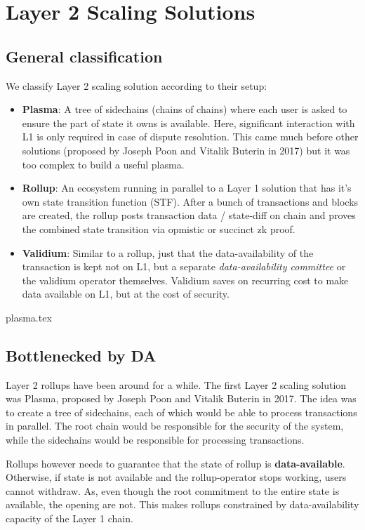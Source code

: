 
\chapter{Layer 2 Scaling Solutions}

\section{General classification}
We classify Layer 2 scaling solution according to their setup:
\begin{itemize}
    \item \textbf{Plasma}: A tree of sidechains (chains of chains) where each user is asked to ensure the part of state it owns is available. Here, significant interaction with L1 is only required in case of dispute resolution. This came much before other solutions (proposed by Joseph Poon and Vitalik Buterin in 2017) but it was too complex to build a useful plasma.
    \item \textbf{Rollup}: An ecosystem running in parallel to a Layer 1 solution that has it's own state transition function (STF). After a bunch of transactions and blocks are created, the rollup posts transaction data / state-diff on chain and proves the combined state transition via opmistic or succinct zk proof.
    \item \textbf{Validium}: Similar to a rollup, just that the data-availability of the transaction is kept not on L1, but a separate \emph{data-availability committee} or the validium operator themselves. Validium saves on recurring cost to make data available on L1, but at the cost of security.
\end{itemize}

{plasma.tex}

\section{Bottlenecked by DA}
Layer 2 rollups have been around for a while. The first Layer 2 scaling solution was Plasma, proposed by Joseph Poon and Vitalik Buterin in 2017. The idea was to create a tree of sidechains, each of which would be able to process transactions in parallel. The root chain would be responsible for the security of the system, while the sidechains would be responsible for processing transactions.

Rollups however needs to guarantee that the state of rollup is \textbf{data-available}. Otherwise, if state is not available and the rollup-operator stops working, users cannot withdraw. As, even though the root commitment to the entire state is available, the opening are not. This makes rollups constrained by data-availability capacity of the Layer 1 chain.

